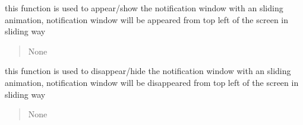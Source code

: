 \documentclass[letterpaper,10pt,english]{sphinxmanual}
\begin{document}
\begin{savenotes}
\begin{fulllineitems}

\begin{savenotes}\begin{fulllineitems}
\label{\detokenize{setting/notif_UI:oxin.notif_UI.UI_main_window.update_current_position}}
\pysigstartsignatures
{}
\pysigstopsignatures
\end{fulllineitems}\end{savenotes}


\begin{savenotes}\begin{fulllineitems}
\label{\detokenize{setting/notif_UI:oxin.notif_UI.UI_main_window.win_appear}}
\pysigstartsignatures
{}
\pysigstopsignatures
\sphinxAtStartPar
this function is used to appear/show the notification window with an sliding animation,
notification window will be appeared from top left of the screen in sliding way
\begin{quote}\begin{description}
\sphinxAtStartPar
None

\end{description}\end{quote}

\end{fulllineitems}\end{savenotes}


\begin{savenotes}\begin{fulllineitems}
\label{\detokenize{setting/notif_UI:oxin.notif_UI.UI_main_window.win_disappear}}
\pysigstartsignatures
{}
\pysigstopsignatures
\sphinxAtStartPar
this function is used to disappear/hide the notification window with an sliding animation,
notification window will be disappeared from top left of the screen in sliding way
\begin{quote}\begin{description}
\sphinxAtStartPar
None


\end{description}
\end{quote}
\end{fulllineitems}
\end{savenotes}
\end{fulllineitems}
\end{savenotes}
\end{document}
